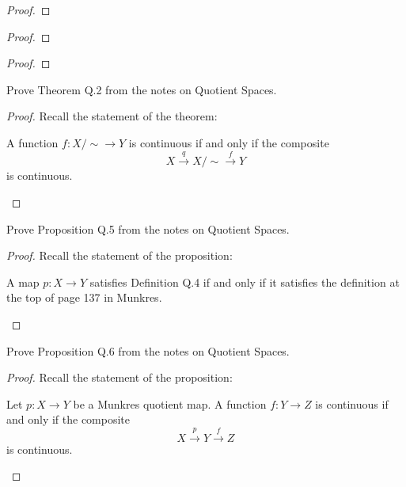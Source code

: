 \begin{problem}[Munkres \S20, Ex.\,\#4(a)]
\end{problem}
\begin{proof}
\end{proof}
\newpage
\begin{problem}[Munkres \S20, Ex.\,\#4(b)]
\end{problem}
\begin{proof}
\end{proof}
\newpage
\begin{problem}[Munkres \S20, Ex.\,\#6]
\end{problem}
\begin{proof}
\end{proof}
\newpage
\begin{problem}[A]
Prove Theorem Q.2 from the notes on Quotient Spaces.
\end{problem}
\begin{proof}
Recall the statement of the theorem:
\begin{theorem*}[Theorem Q.2]
A function $f\colon X/{\sim}\to Y$ is continuous if and only if
the composite
\[
X\overset{q}{\longrightarrow}X/{\sim}\overset{f}{\longrightarrow}Y
\]
is continuous.
\end{theorem*}
\end{proof}
\newpage
\begin{problem}[B]
Prove Proposition Q.5 from the notes on Quotient Spaces.
\end{problem}
\begin{proof}
Recall the statement of the proposition:
\begin{proposition*}[Proposition Q.5]
A map $p\colon X\to Y$ satisfies Definition Q.4 if and only if it
satisfies the definition at the top of page 137 in Munkres.
\end{proposition*}
\end{proof}
\newpage
\begin{problem}[C]
Prove Proposition Q.6 from the notes on Quotient Spaces.
\end{problem}
\begin{proof}
Recall the statement of the proposition:
\begin{proposition*}[Proposition Q.6]
Let $p\colon X\to Y$ be a Munkres quotient map. A function
$f\colon Y\to Z$ is continuous if and only if the composite
\[
X\overset{p}{\longrightarrow}Y\overset{f}{\longrightarrow}Z
\]
is continuous.
\end{proposition*}
\end{proof}
